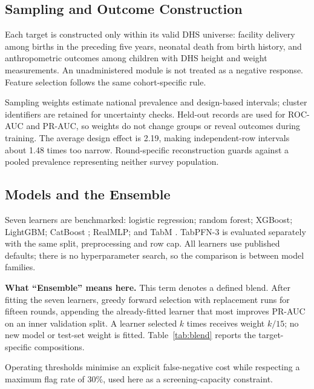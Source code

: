 \documentclass[conference]{IEEEtran}
\begin{document}
\subsection{Sampling and Outcome Construction}
Each target is constructed only within its valid DHS universe: facility
delivery among births in the preceding five years, neonatal death from birth
history, and anthropometric outcomes among children with DHS height and weight
measurements. An unadministered module is not treated as a negative response.
Feature selection follows the same cohort-specific rule.

Sampling weights estimate national prevalence and design-based intervals;
cluster identifiers are retained for uncertainty checks. Held-out records are
used for ROC-AUC and PR-AUC, so weights do not change groups or reveal outcomes
during training. The average design effect is 2.19, making independent-row
intervals about 1.48 times too narrow. Round-specific reconstruction guards
against a pooled prevalence representing neither survey population.

\subsection{Models and the Ensemble}
\label{sec:models}
Seven learners are benchmarked: logistic regression; random forest; XGBoost;
LightGBM; CatBoost \cite{xgboost,lightgbm,catboost}; RealMLP; and TabM
\cite{realmlp,tabm}. TabPFN-3 \cite{tabpfn} is evaluated separately with the
same split, preprocessing and row cap. All learners use published defaults;
there is no hyperparameter search, so the comparison is between model families.

\textbf{What ``Ensemble'' means here.} This term denotes a defined blend. After
fitting the seven learners, greedy forward selection with replacement
\cite{caruana2004} runs for fifteen rounds, appending the already-fitted learner
that most improves PR-AUC on an inner validation split. A learner selected $k$
times receives weight $k/15$; no new model or test-set weight is fitted.
Table~\ref{tab:blend} reports the target-specific compositions.

Operating thresholds minimise an explicit false-negative cost while respecting
a maximum flag rate of 30\%, used here as a screening-capacity constraint.
\end{document}
